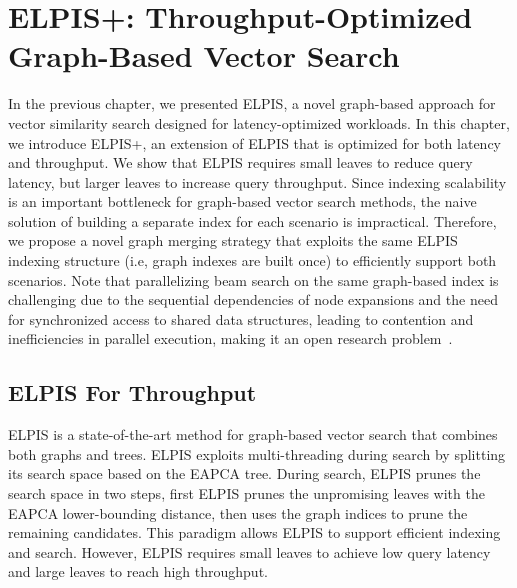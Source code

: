 \graphicspath{{../img/experiments/}}
\chapter{ELPIS+: Throughput-Optimized
Graph-Based Vector Search}
\label{chapter:elpis2}
In the previous chapter, we presented ELPIS, a novel graph-based approach for vector similarity search designed for latency-optimized workloads.
In this chapter, we introduce ELPIS+, an extension of ELPIS that is optimized for both latency and throughput. We show that ELPIS requires small leaves to reduce query latency, but larger leaves to increase query throughput. Since indexing scalability is an important bottleneck for graph-based vector search methods, the naive solution of building a separate index for each scenario is impractical. Therefore, we propose a novel graph merging strategy that exploits the same ELPIS indexing structure (i.e, graph indexes are built once) to efficiently support both scenarios. Note that parallelizing beam search on the same graph-based index is challenging due to the sequential dependencies of node expansions and the need for synchronized access to shared data structures, leading to contention and inefficiencies in parallel execution, making it an open research problem~\cite{leiserson2010work, speedann}.
\clearpage

\section{ELPIS For Throughput}
ELPIS is a state-of-the-art method for graph-based vector search that combines both graphs and trees. ELPIS exploits multi-threading during search by splitting its search space based on the EAPCA tree. During search, ELPIS prunes the search space in two steps, first ELPIS prunes the unpromising leaves with the EAPCA lower-bounding distance, then uses the graph indices to prune the remaining candidates. This paradigm allows ELPIS to support efficient indexing and search. However, ELPIS requires small leaves to achieve low query latency and large leaves to reach high throughput.  


